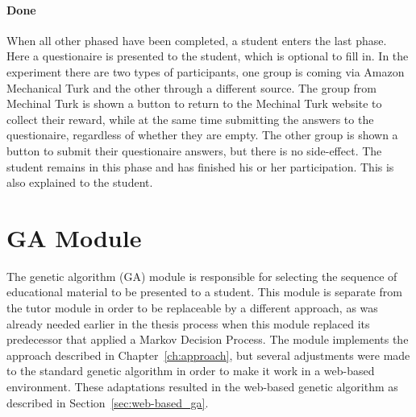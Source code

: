 \paragraph{Done} When all other phased have been completed, a student enters
the last phase. Here a questionaire is presented to the student, which is
optional to fill in. In the experiment there are two types of participants, one
group is coming via Amazon Mechanical Turk and the other through a different
source. The group from Mechinal Turk is shown a button to return to the
Mechinal Turk website to collect their reward, while at the same time
submitting the answers to the questionaire, regardless of whether they are
empty. The other group is shown a button to submit their questionaire answers,
but there is no side-effect. The student remains in this phase and has finished
his or her participation. This is also explained to the student.

\section{GA Module}
\label{sec:software_ga_module}
The genetic algorithm (GA) module is responsible for selecting the sequence of
educational material to be presented to a student. This module is separate from
the tutor module in order to be replaceable by a different approach, as was
already needed earlier in the thesis process when this module replaced its
predecessor that applied a Markov Decision Process. The module implements the
approach described in Chapter~\ref{ch:approach}, but several adjustments were
made to the standard genetic algorithm in order to make it work in a web-based
environment. These adaptations resulted in the web-based genetic algorithm as
described in Section~\ref{sec:web-based_ga}.
